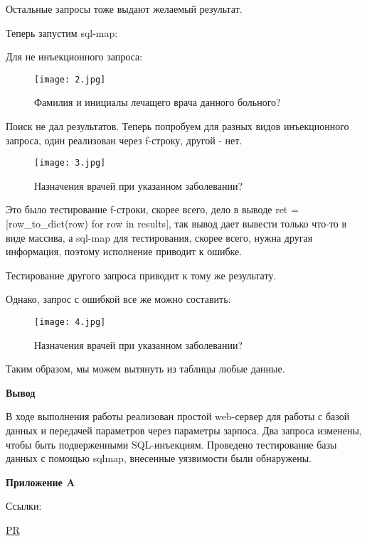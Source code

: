 \documentclass{article}
\begin{document}
\newpage

Остальные запросы тоже выдают желаемый результат.

Теперь запустим sql-map:

Для не инъекционного запроса:

\begin{figure}[h]
\centering
\texttt{[image: 2.jpg]}
\caption{Фамилия и инициалы лечащего врача данного больного?}
\label{fig:mpr}
\end{figure}

Поиск не дал результатов. Теперь попробуем для разных видов инъекционного запроса, один реализован через f-строку, другой - нет.

\begin{figure}[h]
\centering
\texttt{[image: 3.jpg]}
\caption{Назначения врачей при указанном заболевании?}
\label{fig:mpr}
\end{figure}

\newpage

Это было тестирование f-строки, скорее всего, дело в выводе ret = [row\_to\_dict(row) for row in results], так вывод дает вывести только что-то в виде массива, а sql-map для тестирования, скорее всего, нужна другая информация, поэтому исполнение приводит к ошибке.

Тестирование другого запроса приводит к тому же результату.

Однако, запрос с ошибкой все же можно составить:

\begin{figure}[h]
\centering
\texttt{[image: 4.jpg]}
\caption{Назначения врачей при указанном заболевании?}
\label{fig:mpr}
\end{figure}

Таким образом, мы можем вытянуть из таблицы любые данные.

\newpage

\textbf{Вывод}

В ходе выполнения работы реализован простой web-сервер для работы с
базой данных и передачей параметров через параметры зарпоса. Два запроса
изменены, чтобы быть подверженными SQL-инъекциям. Проведено
тестирование базы данных с помощью sqlmap, внесенные уязвимости были
обнаружены.

\newpage

\textbf{Приложение A}

Ссылки:

\href{https://github.com/moevm/sql-2023-1304/pull/84}{PR}
\end{document}
